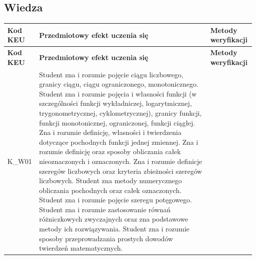\documentclass[12pt, a4paper]{article}
\newcommand{\thdrule}{\noalign{\global\setlength{\extrarowheight}{0pt}}}
\newcommand{\thdend}{\noalign{\global\setlength{\extrarowheight}{3pt}}}
\begin{document}
\subsection*{Wiedza}
{\scriptsize
\begin{longtable}{m{1.6cm}m{9.0cm}m{4.2cm}}
\thdrule\toprule
\rowcolor{pjatkRed} {\color{white}\footnotesize\textbf{\vphantom{Ag}Kod KEU}} & {\color{white}\footnotesize\textbf{\vphantom{Ag}Przedmiotowy efekt uczenia się}} & {\color{white}\footnotesize\textbf{\vphantom{Ag}Metody weryfikacji}} \\
\midrule\thdend
\endfirsthead
\thdrule\toprule
\rowcolor{pjatkRed} {\color{white}\footnotesize\textbf{\vphantom{Ag}Kod KEU}} & {\color{white}\footnotesize\textbf{\vphantom{Ag}Przedmiotowy efekt uczenia się}} & {\color{white}\footnotesize\textbf{\vphantom{Ag}Metody weryfikacji}} \\
\midrule\thdend
\endhead
  \rowcolor{tableRowLight} K\_W01 & Student zna i rozumie pojęcie ciągu liczbowego, granicy ciągu, ciągu ograniczonego, monotonicznego. Student zna i rozumie pojęcia i własności funkcji (w szczególności funkcji wykładniczej, logarytmicznej, trygonometrycznej, cyklometrycznej), granicy funkcji, funkcji monotonicznej, ograniczonej, funkcji ciągłej. Zna i rozumie definicję, własności i twierdzenia dotyczące pochodnych funkcji jednej zmiennej. Zna i rozumie definicję oraz sposoby obliczania całek nieoznaczonych i oznaczonych. Zna i rozumie definicje szeregów liczbowych oraz kryteria zbieżności szeregów liczbowych. Student zna metody numerycznego obliczania pochodnych oraz całek oznaczonych. Student zna i rozumie pojęcie szeregu potęgowego.  Student zna i rozumie zastosowanie równań różniczkowych zwyczajnych oraz zna podstawowe metody ich rozwiązywania. Student zna i rozumie sposoby przeprowadzania prostych dowodów twierdzeń matematycznych. &  \\
\bottomrule
\end{longtable}}
\end{document}
